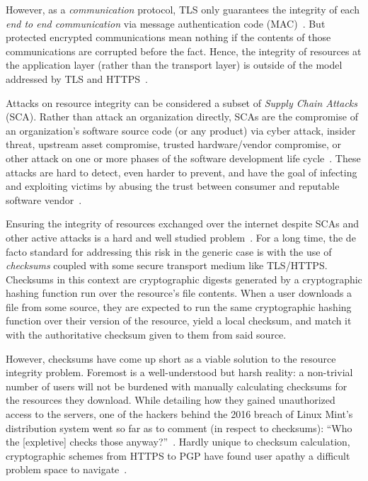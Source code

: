 However, as a \textit{communication} protocol, TLS only guarantees the integrity
of each \textit{end to end communication} via message authentication code
(MAC)~\cite{TLS1.2}. But protected encrypted communications mean nothing if the
contents of those communications are corrupted before the fact. Hence, the
integrity of resources at the application layer (rather than the transport
layer) is outside of the model addressed by TLS and HTTPS~\cite{TLS1.2, HTTPS}.

Attacks on resource integrity can be considered a subset of \emph{Supply Chain
Attacks} (SCA). Rather than attack an organization directly, SCAs are the
compromise of an organization's software source code (or any product) via cyber
attack, insider threat, upstream asset compromise, trusted hardware/vendor
compromise, or other attack on one or more phases of the software development
life cycle~\cite{NIST-SCA}. These attacks are hard to detect, even harder to
prevent, and have the goal of infecting and exploiting victims by abusing the
trust between consumer and reputable software vendor~\cite{SCA}.

Ensuring the integrity of resources exchanged over the internet despite SCAs and
other active attacks is a hard and well studied problem~\cite{MD5Header,
HTTP1.1, HTTPS, SRI, LF, OpenPGP1, DNSSEC, PKI}. For a long time, the de facto
standard for addressing this risk in the generic case is with the use of
\textit{checksums} coupled with some secure transport medium like TLS/HTTPS.
Checksums in this context are cryptographic digests generated by a cryptographic
hashing function run over the resource's file contents. When a user downloads a
file from some source, they are expected to run the same cryptographic hashing
function over their version of the resource, yield a local checksum, and match
it with the authoritative checksum given to them from said source.

However, checksums have come up short as a viable solution to the resource
integrity problem. Foremost is a well-understood but harsh reality: a
non-trivial number of users will not be burdened with manually calculating
checksums for the resources they download. While detailing how they gained
unauthorized access to the servers, one of the hackers behind the 2016 breach of
Linux Mint's distribution system went so far as to comment (in respect to
checksums): ``Who the [expletive] checks those anyway?''~\cite{SCA-MINT3}.
Hardly unique to checksum calculation, cryptographic schemes from HTTPS to PGP
have found user apathy a difficult problem space to navigate~\cite{PGPBad,
Clickthrough}.

